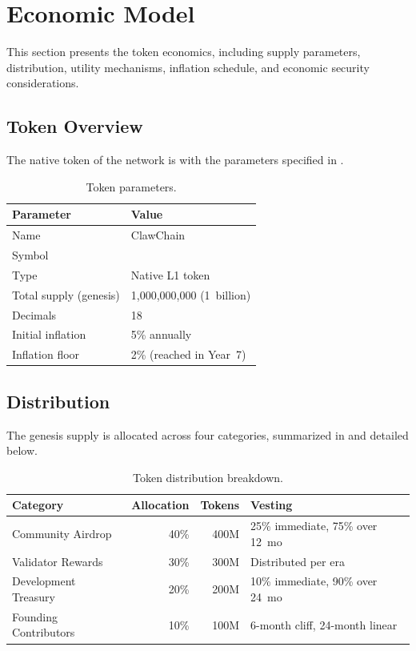 
\section{Economic Model}
\label{sec:tokenomics}

This section presents the \claw{} token economics, including supply parameters, distribution, utility mechanisms, inflation schedule, and economic security considerations.

\subsection{Token Overview}

The native token of the \claw{} network is \clawtoken{} with the parameters specified in .

\begin{table}[ht]
\centering
\caption{Token parameters.}
\label{tab:token-params}
\begin{tabular}{@{}ll@{}}
\toprule
\textbf{Parameter} & \textbf{Value} \\
\midrule
Name & ClawChain \\
Symbol & \clawtoken{} \\
Type & Native L1 token \\
Total supply (genesis) & 1{,}000{,}000{,}000 (1~billion) \\
Decimals & 18 \\
Initial inflation & 5\% annually \\
Inflation floor & 2\% (reached in Year~7) \\
\bottomrule
\end{tabular}
\end{table}

\subsection{Distribution}
\label{sec:distribution}

The genesis supply is allocated across four categories, summarized in  and detailed below.

\begin{table}[ht]
\centering
\caption{Token distribution breakdown.}
\label{tab:distribution}
\begin{tabular}{@{}lrrl@{}}
\toprule
\textbf{Category} & \textbf{Allocation} & \textbf{Tokens} & \textbf{Vesting} \\
\midrule
Community Airdrop & 40\% & 400M & 25\% immediate, 75\% over 12~mo \\
Validator Rewards & 30\% & 300M & Distributed per era \\
Development Treasury & 20\% & 200M & 10\% immediate, 90\% over 24~mo \\
Founding Contributors & 10\% & 100M & 6-month cliff, 24-month linear \\
\bottomrule
\end{tabular}
\end{table}

